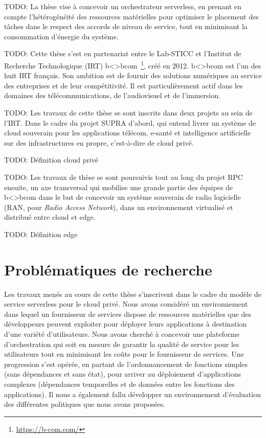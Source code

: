TODO: La thèse vise à concevoir un orchestrateur serverless, en prenant en compte l’hétérogénéité des ressources matérielles pour optimiser le placement des tâches dans le respect des accords de niveau de service, tout en minimisant la consommation d'énergie du système.

TODO: Cette thèse s'est en partenariat entre le Lab-STICC et l'Institut de Recherche Technologique (IRT) b{\textless\textgreater}bcom~\footnote{\href{https://b-com.com/}{https://b-com.com/}}, créé en 2012. b{\textless\textgreater}bcom est l'un des huit IRT français. Son ambition est de fournir des solutions numériques au service des entreprises et de leur compétitivité. Il est particulièrement actif dans les domaines des télécommunications, de l'audiovisuel et de l'immersion.

TODO: Les travaux de cette thèse se sont inscrits dans deux projets au sein de l'IRT. Dans le cadre du projet SUPRA d'abord, qui entend livrer un système de cloud souverain pour les applications télécom, e-santé et intelligence artificielle sur des infrastructures en propre, c'est-à-dire de cloud privé.

TODO: Définition cloud privé

TODO: Les travaux de thèse se sont poursuivis tout au long du projet RPC ensuite, un axe transversal qui mobilise une grande partie des équipes de b{\textless\textgreater}bcom dans le but de concevoir un système souverain de radio logicielle (RAN, pour \textit{Radio Access Network}), dans un environnement virtualisé et distribué entre cloud et edge.

TODO: Définition edge

\section{Problématiques de recherche}

Les travaux menés au cours de cette thèse s'inscrivent dans le cadre du modèle de service serverless pour le cloud privé. Nous avons considéré un environnement dans lequel un fournisseur de services dispose de ressources matérielles que des développeurs peuvent exploiter pour déployer leurs applications à destination d'une variété d'utilisateurs. Nous avons cherché à concevoir une plateforme d'orchestration qui soit en mesure de garantir la qualité de service pour les utilisateurs tout en minimisant les coûts pour le fournisseur de services. Une progression s'est opérée, en partant de l'ordonnancement de fonctions simples (sans dépendances et sans état), pour arriver au déploiement d'applications complexes (dépendances temporelles et de données entre les fonctions des applications). Il nous a également fallu développer un environnement d'évaluation des différentes politiques que nous avons proposées.


